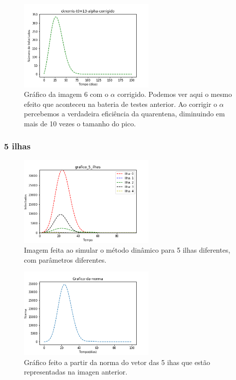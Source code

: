 \documentclass[11pt]{article}
\begin{document}
\begin{figure}[htbp]
\centering
\includegraphics[width=250px]{images/cknorris-t0=13-alpha-corrigido.png}
\caption{Gráfico da imagem 6 com o \(\alpha\) corrigido. Podemos ver aqui o mesmo efeito que aconteceu na bateria de testes anterior. Ao corrigir o \(\alpha\) percebemos a verdadeira eficiência da quarentena, diminuindo em mais de 10 vezes o tamanho do pico.}
\end{figure}
\newpage    
\subsubsection{5 ilhas}
\label{sec:org7324990}
\begin{figure}[htbp]
\centering
\includegraphics[width=250px]{images/grafico_5_ilhas.png}
\caption{Imagem feita ao simular o método dinâmico para 5 ilhas diferentes, com parâmetros diferentes.}
\end{figure}

\begin{figure}[htbp]
\centering
\includegraphics[width=250px]{images/Grafico-da-norma.png}
\caption{Gráfico feito a partir da norma do vetor das 5 ihas que estão representadas na imagen anterior.}
\end{figure}
\end{document}
